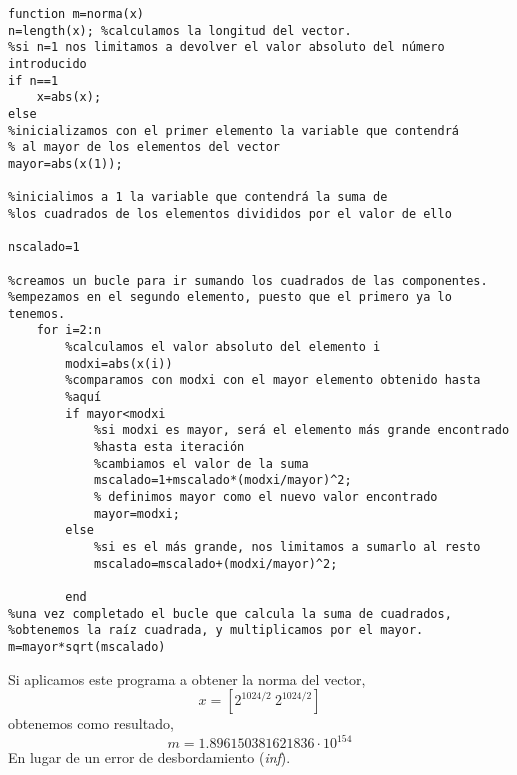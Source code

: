 \begin{verbatim}
function m=norma(x)
n=length(x); %calculamos la longitud del vector.
%si n=1 nos limitamos a devolver el valor absoluto del número introducido
if n==1
	x=abs(x);
else
%inicializamos con el primer elemento la variable que contendrá
% al mayor de los elementos del vector
mayor=abs(x(1));

%inicialimos a 1 la variable que contendrá la suma de
%los cuadrados de los elementos divididos por el valor de ello

nscalado=1

%creamos un bucle para ir sumando los cuadrados de las componentes.
%empezamos en el segundo elemento, puesto que el primero ya lo tenemos.
	for i=2:n	
		%calculamos el valor absoluto del elemento i
		modxi=abs(x(i))
		%comparamos con modxi con el mayor elemento obtenido hasta
		%aquí
		if mayor<modxi
			%si modxi es mayor, será el elemento más grande encontrado
			%hasta esta iteración
			%cambiamos el valor de la suma 
			mscalado=1+mscalado*(modxi/mayor)^2;
			% definimos mayor como el nuevo valor encontrado
			mayor=modxi;
		else
			%si es el más grande, nos limitamos a sumarlo al resto
			mscalado=mscalado+(modxi/mayor)^2;
	
		end
%una vez completado el bucle que calcula la suma de cuadrados,
%obtenemos la raíz cuadrada, y multiplicamos por el mayor.
m=mayor*sqrt(mscalado)
\end{verbatim}

Si aplicamos este programa a obtener la norma del vector,
\begin{equation*}
x=[2^{1024/2}\ 2^{1024/2}]
\end{equation*}
obtenemos como resultado,
\begin{equation*}
m=1.896150381621836\cdot10^{154}
\end{equation*}
En lugar de un error de desbordamiento (\emph{inf}).



  	 
